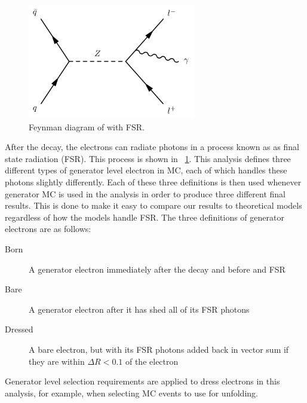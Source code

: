 \begin{figure}[!htbp]
    \centering
    \includegraphics[width=0.65\textwidth]{figures/fsr.pdf}
    \caption{
        Feynman diagram of \Ztoll with FSR.
    }
    \label{fig:fsr_diagram}
\end{figure}

After the \Ztoee decay, the electrons can radiate photons in a process known as
as final state radiation (FSR). This process is shown in
\FIG~\ref{fig:fsr_diagram}. This analysis defines three different types of
generator level electron in MC, each of which handles these photons slightly
differently. Each of these three definitions is then used whenever generator MC
is used in the analysis in order to produce three different final results. This
is done to make it easy to compare our results to theoretical models regardless
of how the models handle FSR. The three definitions of generator electrons are
as follows:

\begin{description}
    \item[Born] A generator electron immediately after the \Ztoee decay and
        before and FSR
    \item[Bare] A generator electron after it has shed all of its FSR photons
    \item[Dressed] A bare electron, but with its FSR photons added back in
        vector sum if they are within $\Delta R < 0.1$ of the electron
\end{description}

Generator level selection requirements are applied to dress electrons in this
analysis, for example, when selecting MC events to use for unfolding.
